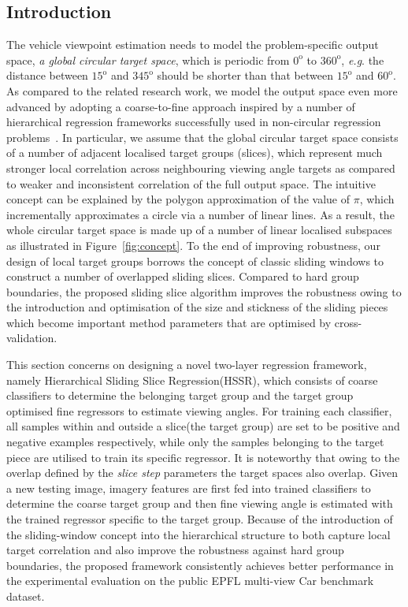 \documentclass{tutmscthesis}[2010/09/22]
\numberwithin{equation}{section}
\numberwithin{table}{section}
\numberwithin{figure}{section}
\def\onedot{. }
\def\eg{\emph{e.g}\onedot} \def\Eg{\emph{E.g}\onedot}
\begin{document}
\subsection{Introduction}
The vehicle viewpoint estimation needs to model the
problem-specific output space, \textit{a global circular target space},
which is periodic from $0^\text{o}$ to $360^\text{o}$, \eg the
distance between $15^\text{o}$ and $345^\text{o}$ should be shorter
than that between $15^\text{o}$ and $60^\text{o}$. As compared to the
related research work, we model the output
space even more advanced by adopting a coarse-to-fine approach
inspired by a number of hierarchical regression frameworks successfully
used in non-circular regression
problems~\cite{dantone2014body,dantone2012real,foytik2013two,liu2015age}.
In particular, we assume
that the global circular target space consists of a number
of adjacent localised target groups (slices), which represent
much stronger local correlation across neighbouring viewing angle targets
as compared to weaker and inconsistent correlation of the full
output space.  
The intuitive concept can be explained by the polygon approximation of
the value of $\pi$, which incrementally approximates a circle via a
number of linear lines.  
As a result, the whole circular target space is made up of a number of
linear localised subspaces as illustrated in Figure~\ref{fig:concept}.
To the end of improving robustness, our design of local target groups
borrows the concept of classic sliding windows to construct a
number of overlapped sliding slices.
Compared to hard group boundaries, the proposed sliding slice
algorithm improves the robustness owing to the introduction and
optimisation of the size and stickness of the sliding pieces which
become important method parameters that are optimised by cross-validation.



This section concerns on designing a novel two-layer regression framework, namely Hierarchical Sliding Slice Regression(HSSR), which consists of coarse classifiers to determine the belonging target group and the target group optimised fine regressors to estimate viewing angles. For training each classifier, all samples within and outside a slice(the target group) are set to be positive and negative examples respectively, while only the samples belonging to the target piece are  utilised to train its specific regressor. It is noteworthy that owing to the overlap defined by the \textit{slice step} parameters the target spaces also overlap. Given a new testing image, imagery features are first fed into trained classifiers to determine the coarse target group and then fine viewing angle is estimated with the trained regressor specific to the target group. Because of the introduction of the sliding-window concept into the hierarchical structure to both capture local target correlation and also improve the robustness against hard group boundaries, the proposed framework consistently achieves better performance in the experimental evaluation on the public EPFL multi-view Car benchmark dataset.
\end{document}
